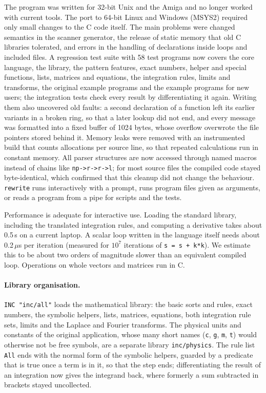 \documentclass[11pt,a4paper]{article}
\begin{document}
The program was written for 32-bit Unix and the Amiga and no longer worked
with current tools. The port to 64-bit Linux and Windows (MSYS2) required
only small changes to the C code itself. The main problems were changed
semantics in the scanner generator, the release of static memory that old
C libraries tolerated, and errors in the handling of declarations inside
loops and included files. A regression test suite with 58 test programs
now covers the core language, the library, the pattern features, exact
numbers, helper and special functions, lists, matrices and equations, the
integration rules, limits and transforms, the original example programs and
the example programs for new users; the integration tests check every result by
differentiating it again. Writing them also uncovered old faults: a
second declaration of a function left its earlier variants in a broken
ring, so that a later lookup did not end, and every message was formatted
into a fixed buffer of 1024 bytes, whose overflow overwrote the file
pointers stored behind it. Memory leaks were removed with an instrumented
build that counts allocations per source line, so that repeated
calculations run in constant memory. All parser structures are now
accessed through named macros instead of chains like
\texttt{np->r->r->l}; for most source files the compiled code stayed
byte-identical, which confirmed that this cleanup did not change the
behaviour. \texttt{rewrite} runs interactively with a prompt, runs program
files given as arguments, or reads a program from a pipe for scripts and
the tests.

Performance is adequate for interactive use. Loading the standard library,
including the translated integration rules, and computing a derivative
takes about 0.5\,s on a current laptop. A scalar loop
written in the language itself needs about 0.2\,$\mu$s per iteration
(measured for $10^7$ iterations of \texttt{s = s + k*k}). We estimate this
to be about two orders of magnitude slower than an equivalent compiled
loop. Operations on whole vectors and matrices run in C.

\paragraph{Library organisation.} \texttt{INC "inc/all"} loads the
mathematical library: the basic sorts and rules, exact numbers, the
symbolic helpers, lists, matrices, equations, both integration rule
sets, limits and the Laplace and Fourier transforms. The physical units and constants of the original application, whose
many short names (\texttt{c}, \texttt{g}, \texttt{m}, \texttt{t}) would
otherwise not be free symbols, are a separate library \texttt{inc/physics}.
The rule list \texttt{All} ends with the normal form of the symbolic
helpers, guarded by a predicate that is true once a term is in it, so that
the step ends; differentiating the result of an integration now gives the
integrand back, where formerly a sum subtracted in brackets stayed
uncollected.
\end{document}
